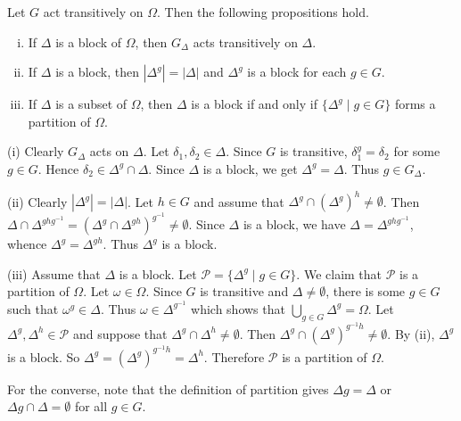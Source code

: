 \begin{proposition}
	Let $G$ act transitively on $\Omega$.  Then the following propositions hold.
	\begin{enumerate}[(i)]
		\item If $\Delta$ is a block of $\Omega$, then $G_{\Delta}$ acts transitively on $\Delta$. 
		\item If $\Delta$ is a block, then $|\Delta^g| = |\Delta|$ and $\Delta^g$ is a block for each $g\in G$. 
		\item If $\Delta$ is a subset of $\Omega$, then $\Delta$ is a block if and only if $\{\Delta^g\mid g\in G\}$ forms a partition of $\Omega$.
	\end{enumerate}  
\end{proposition}
\begin{sketch}
	(i) Clearly $G_{\Delta}$ acts on $\Delta$. Let $\delta_1,\delta_2\in\Delta$. Since $G$ is transitive, $\delta_1^g = \delta_2$ for some $g\in G$. Hence $\delta_2\in \Delta^g\cap \Delta$. Since $\Delta$ is a block, we get $\Delta^g = \Delta$. Thus $g\in G_\Delta$.
	
	(ii) Clearly $|\Delta^g| = |\Delta|$.  Let $h\in G$ and assume that  $\Delta^g \cap (\Delta^g)^h \neq \emptyset$. Then $\Delta \cap \Delta^{g h g^{-1}}  = (\Delta^g \cap \Delta^{gh})^{g^{-1}} \neq \emptyset$. Since $\Delta$ is a block, we have  $\Delta = \Delta^{g h g^{-1}}$, whence $\Delta^g = \Delta^{g h}$. Thus $\Delta^g$ is a block.
	
	(iii) Assume that $\Delta$ is a block. Let $\mathcal{P} = \{\Delta^g \mid g \in G\}$. We claim that $\mathcal{P}$ is a partition of $\Omega$. Let $\omega \in \Omega$. Since $G$ is transitive and $\Delta \neq \emptyset$, there is some $g \in G$ such that $\omega^g \in \Delta$. Thus $\omega \in \Delta^{g^{-1}} $ which shows that $\bigcup_{g \in G} \Delta^g = \Omega$.  Let $\Delta^g, \Delta^h \in \mathcal{P}$ and suppose that $\Delta^g \cap \Delta^h \neq \emptyset$. Then $\Delta^g \cap (\Delta^g)^{g^{-1} h} \neq \emptyset$. By (ii), $\Delta^g$ is a block. So $\Delta^g = (\Delta^g)^{g^{-1} h} = \Delta^h$. Therefore $\mathcal{P}$ is a partition of $\Omega$. 
	
	For the converse, note that the definition of partition gives $\Delta g = \Delta$ or $\Delta g \cap \Delta = \emptyset$ for all $g \in G$.
\end{sketch}

